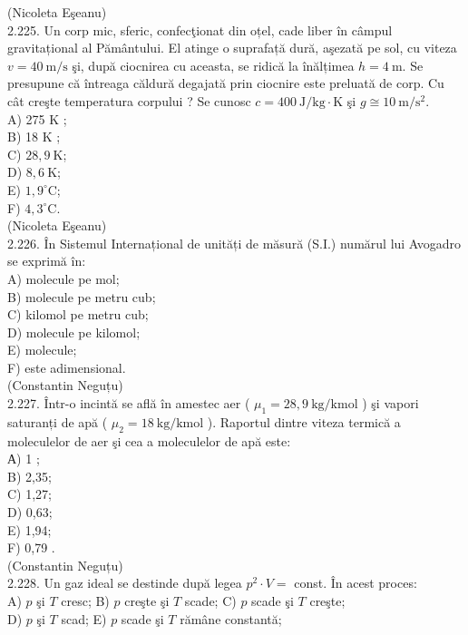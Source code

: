 \documentclass[10pt]{article}
\begin{document}
(Nicoleta Eşeanu)\\
2.225. Un corp mic, sferic, confecţionat din oțel, cade liber în câmpul gravitațional al Pământului. El atinge o suprafață dură, aşezată pe sol, cu viteza $v=40 \mathrm{~m} / \mathrm{s}$ şi, după ciocnirea cu aceasta, se ridică la înălțimea $h=4 \mathrm{~m}$. Se presupune că întreaga căldură degajată prin ciocnire este preluată de corp. Cu cât creşte temperatura corpului ? Se cunosc $c=400 \mathrm{~J} / \mathrm{kg} \cdot \mathrm{K}$ şi $g \cong 10 \mathrm{~m} / \mathrm{s}^{2}$.\\
A) 275 K ;\\
B) 18 K ;\\
C) $28,9 \mathrm{~K}$;\\
D) $8,6 \mathrm{~K}$;\\
E) $1,9^{\circ} \mathrm{C}$;\\
F) $4,3^{\circ} \mathrm{C}$.\\
(Nicoleta Eşeanu)\\
2.226. În Sistemul Internațional de unități de măsură (S.I.) numărul lui Avogadro se exprimă în:\\
A) molecule pe mol;\\
B) molecule pe metru cub;\\
C) kilomol pe metru cub;\\
D) molecule pe kilomol;\\
E) molecule;\\
F) este adimensional.\\
(Constantin Neguțu)\\
2.227. Într-o incintă se află în amestec aer ( $\mu_{1}=28,9 \mathrm{~kg} / \mathrm{kmol}$ ) şi vapori saturanți de apă ( $\mu_{2}=18 \mathrm{~kg} / \mathrm{kmol}$ ). Raportul dintre viteza termică a moleculelor de aer şi cea a moleculelor de apă este:\\
А) 1 ;\\
B) 2,35;\\
C) 1,27;\\
D) 0,63;\\
E) 1,94;\\
F) 0,79 .\\
(Constantin Neguțu)\\
2.228. Un gaz ideal se destinde după legea $p^{2} \cdot V=$ const. În acest proces:\\
A) $p$ şi $T$ cresc; B) $p$ creşte şi $T$ scade; C) $p$ scade şi $T$ creşte;\\
D) $p$ şi $T$ scad; E) $p$ scade şi $T$ rămâne constantă;\\
\end{document}
